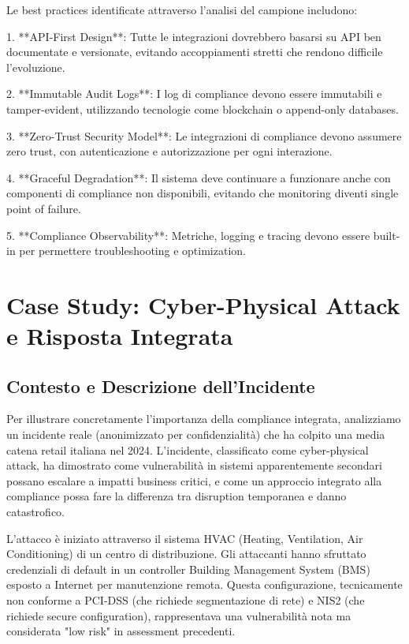 Le best practices identificate attraverso l'analisi del campione includono:

1. **API-First Design**: Tutte le integrazioni dovrebbero basarsi su API ben documentate e versionate, evitando accoppiamenti stretti che rendono difficile l'evoluzione.

2. **Immutable Audit Logs**: I log di compliance devono essere immutabili e tamper-evident, utilizzando tecnologie come blockchain o append-only databases.

3. **Zero-Trust Security Model**: Le integrazioni di compliance devono assumere zero trust, con autenticazione e autorizzazione per ogni interazione.

4. **Graceful Degradation**: Il sistema deve continuare a funzionare anche con componenti di compliance non disponibili, evitando che monitoring diventi single point of failure.

5. **Compliance Observability**: Metriche, logging e tracing devono essere built-in per permettere troubleshooting e optimization.

\section{Case Study: Cyber-Physical Attack e Risposta Integrata}

\subsection{Contesto e Descrizione dell'Incidente}

Per illustrare concretamente l'importanza della compliance integrata, analizziamo un incidente reale (anonimizzato per confidenzialità) che ha colpito una media catena retail italiana nel 2024. L'incidente, classificato come cyber-physical attack, ha dimostrato come vulnerabilità in sistemi apparentemente secondari possano escalare a impatti business critici, e come un approccio integrato alla compliance possa fare la differenza tra disruption temporanea e danno catastrofico.

L'attacco è iniziato attraverso il sistema HVAC (Heating, Ventilation, Air Conditioning) di un centro di distribuzione. Gli attaccanti hanno sfruttato credenziali di default in un controller Building Management System (BMS) esposto a Internet per manutenzione remota. Questa configurazione, tecnicamente non conforme a PCI-DSS (che richiede segmentazione di rete) e NIS2 (che richiede secure configuration), rappresentava una vulnerabilità nota ma considerata "low risk" in assessment precedenti.

